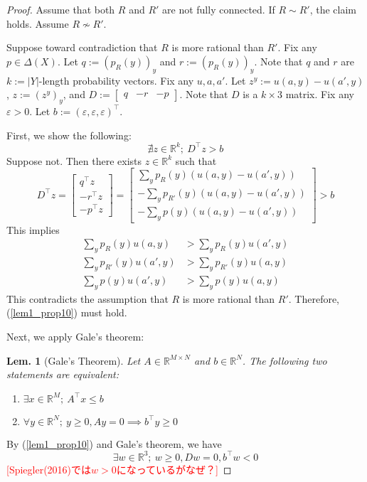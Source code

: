 \documentclass[11pt,a4paper,dvipdfmx]{article}
\theoremstyle{plain}
\newtheorem{lem}{Lem.}[section]
\newcommand{\R}{\mathbb{R}}
\renewcommand{\epsilon}{\varepsilon}
\newcommand{\ocomment}[1]{{\textcolor{red}{#1}}}
\begin{document}
\begin{proof}
	Assume that both $R$ and $R'$ are not fully connected.
	If $R \sim R'$, the claim holds. Assume $R \nsim R'$.
	
	Suppose toward contradiction that $R$ is more rational than $R'$.
	Fix any $p \in \Delta(X)$. Let $q := (p_R(y))_y$ and $r:=(p_R(y))_y$. Note that $q$ and $r$ are $k:=|Y|$-length probability vectors.
	Fix any $u,a,a'$. Let $z^y := u(a, y) - u(a', y)$, $z := (z^y)_y$, and 
	$D:= [
	\begin{matrix}
		q & -r & -p
	\end{matrix}
	]
	$. Note that $D$ is a $k \times 3$ matrix. Fix any $\epsilon > 0$. Let $b := (\epsilon, \epsilon, \epsilon)^\top$.
	
	First, we show the following:
	\begin{equation}
		\nexists z \in \R^k; \ D^\top z > b \label{lem1_prop10}
	\end{equation}
	Suppose not. Then there exists $z \in \R^k$ such that
	\[
	D^\top z =
	\left[
	\begin{matrix}
		q^\top z \\
		-r^\top z \\
		-p^\top z
	\end{matrix}
	\right]
	= 
	\left[
	\begin{matrix}
	\sum_y p_R(y)(u(a, y) - u(a', y)) \\
	- \sum_y p_{R'}(y)(u(a, y) - u(a', y)) \\
	- \sum_y p(y)(u(a, y) - u(a', y))
	\end{matrix}
	\right]
	> b
	\]
	This implies
	\begin{align*}
		\sum_y p_R(y)u(a, y) &> \sum_y p_R(y)u(a', y) \\
		\sum_y p_{R'}(y)u(a', y) &> \sum_y p_{R'}(y)u(a, y) \\
		\sum_y p(y)u(a', y) &> \sum_y p(y)u(a, y)
	\end{align*}
	This contradicts the assumption that $R$ is more rational than $R'$. Therefore, (\ref{lem1_prop10}) must hold.
	
	Next, we apply Gale's theorem:
	\begin{screen}
	\begin{lem}[Gale's Theorem]
		Let $A \in \R^{M \times N}$ and $b \in \R^N$. The following two statements are equivalent:
		\begin{enumerate}
			\item $\exists x \in \R^M; \ A^\top x \leq b$
			\item $\forall y \in \R^N; \ y \geq 0, Ay=0 \implies b^\top y \geq 0$
		\end{enumerate}
	\end{lem}	
	\end{screen}
	By (\ref{lem1_prop10}) and Gale's theorem, we have
	\[
	\exists w \in \R^3; \ w \geq 0, Dw = 0, b^\top w < 0
	\]
	\ocomment{[Spiegler(2016)では$w > 0$になっているがなぜ？]}
	

\end{proof}
\end{document}
